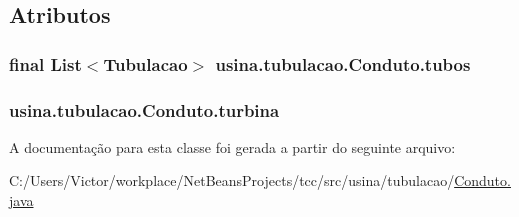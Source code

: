\subsection{Atributos}
\hypertarget{classusina_1_1tubulacao_1_1_conduto_a0818dcc694d38d10020eb0335e4d44b0}{
\subsubsection[{tubos}]{\setlength{\rightskip}{0pt plus 5cm}final List$<$Tubulacao$>$ usina.\-tubulacao.\-Conduto.\-tubos\hspace{0.3cm}{\ttfamily [private]}}}\label{classusina_1_1tubulacao_1_1_conduto_a0818dcc694d38d10020eb0335e4d44b0}
\hypertarget{classusina_1_1tubulacao_1_1_conduto_a82d53c81437766af2da7d80771ab5fad}{
\subsubsection[{turbina}]{ usina.\-tubulacao.\-Conduto.\-turbina\hspace{0.3cm}{\ttfamily [private]}}}\label{classusina_1_1tubulacao_1_1_conduto_a82d53c81437766af2da7d80771ab5fad}


A documentação para esta classe foi gerada a partir do seguinte arquivo\-:\begin{DoxyCompactItemize}
\item 
C\-:/\-Users/\-Victor/workplace/\-Net\-Beans\-Projects/tcc/src/usina/tubulacao/\hyperlink{_conduto_8java}{Conduto.\-java}\end{DoxyCompactItemize}
